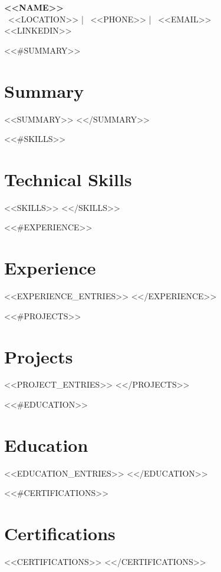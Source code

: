 \documentclass[11pt,a4paper]{article}
\begin{document}
\begin{center}
  {\LARGE\textbf{<<NAME>>}} \\[3pt]
  \small
  \faMapMarker\ {<<LOCATION>>} \quad | \quad \faPhone\ {<<PHONE>>} \quad | \quad \faEnvelope\ {<<EMAIL>>} \\[2pt]
  {<<LINKEDIN>>}  
\end{center}

<<#SUMMARY>>
\section{Summary}
<<SUMMARY>>
<</SUMMARY>>

<<#SKILLS>>
\section{Technical Skills}
<<SKILLS>>
<</SKILLS>>

<<#EXPERIENCE>>
\section{Experience}
<<EXPERIENCE_ENTRIES>>
<</EXPERIENCE>>

<<#PROJECTS>>
\section{Projects}
<<PROJECT_ENTRIES>>
<</PROJECTS>>

<<#EDUCATION>>
\section{Education}
<<EDUCATION_ENTRIES>>
<</EDUCATION>>

<<#CERTIFICATIONS>>
\section{Certifications}
<<CERTIFICATIONS>>
<</CERTIFICATIONS>>
\end{document}
